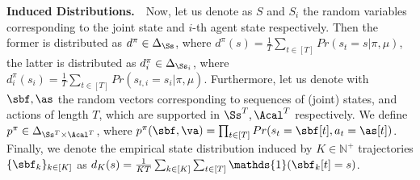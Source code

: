 \textbf{Induced Distributions.}~~Now, let us denote as $S$ and $S_i$ the random variables corresponding to the joint state and $i$-th agent state respectively. Then the former is distributed as $d^\pi \in \Delta_{\Ss}$, where $d^\pi (s) = \frac{1}{T} \sum_{t \in [T]} Pr (s_t = s|\pi,\mu)$, the latter is distributed as $d^\pi_i \in \Delta_{\Ss_i}$, where $d^\pi_i (s_i) = \frac{1}{T} \sum_{t \in [T]} Pr (s_{t,i} = s_i|\pi,\mu)$. 
Furthermore, let us denote with $\sbf,\as$ the random vectors corresponding to sequences of (joint) states, and actions of length $T$, which are supported in $\Ss^T, \Acal^T$ respectively. We define $p^\pi \in \Delta_{\Ss^T \times \Acal^T}$, where $p^\pi(\sbf,\va) = \prod_{t \in [T]}Pr(s_t = \sbf[t], a_t = \as[t])$. Finally, we denote the empirical state distribution induced by $K \in \mathbb N^+$ trajectories $\{\sbf_k\}_{k \in [K]}$ as $d_K (s) = \frac{1}{KT}  \sum_{k \in [K]} \sum_{t \in [T]}  \mathds{1} (\sbf_k[t] = s)$.

